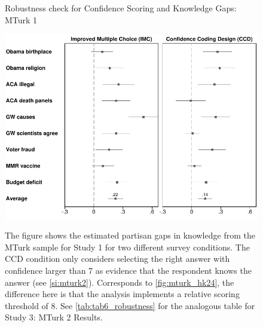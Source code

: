 \begin{center}
	\begin{figure}[ht]
		\centering
            \caption{Robustness check for Confidence Scoring and Knowledge Gaps: MTurk 1}
		\includegraphics[width=.9\textwidth]{../figs/partisan-gap-by-item-arm-14k-24k-greaterthan7.pdf}
		\label{fig:mturk_hk24_greaterthan7}
		\caption*{\footnotesize
		The figure shows the estimated partisan gaps in knowledge from the MTurk sample for Study 1 for two different survey conditions. The CCD condition only considers selecting the right answer with confidence larger than 7 as evidence that the respondent knows the answer (see \cref{si:mturk2}). Corresponds to \cref{fig:mturk_hk24}, the difference here is that the analysis implements a relative scoring threshold of 8. See \cref{tab:tab6_robustness} for the analogous table for Study 3: MTurk 2 Results.
		}
	\end{figure}
\end{center}


